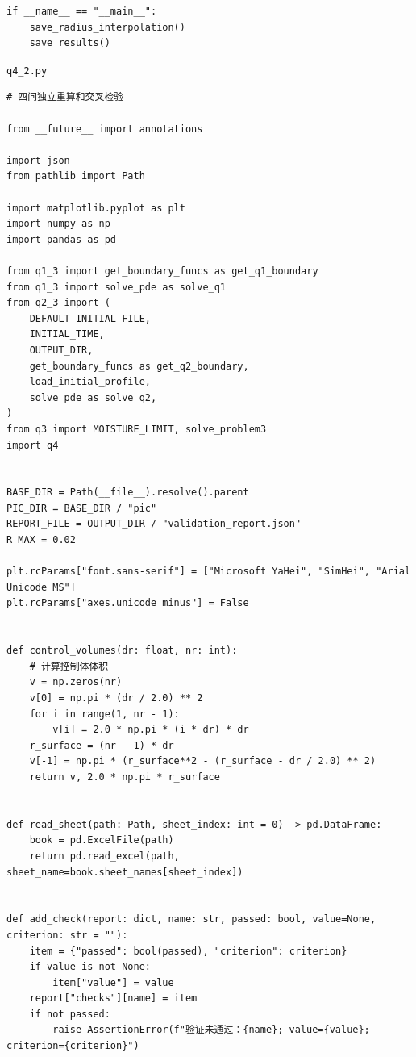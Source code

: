 \documentclass[withoutpreface,bwprint]{cumcm_thesis}
\begin{document}
\begin{appendices}
\begin{lstlisting}
if __name__ == "__main__":
    save_radius_interpolation()
    save_results()

\end{lstlisting}
\noindent\texttt{q4\_2.py}
\begin{lstlisting}
# 四问独立重算和交叉检验

from __future__ import annotations

import json
from pathlib import Path

import matplotlib.pyplot as plt
import numpy as np
import pandas as pd

from q1_3 import get_boundary_funcs as get_q1_boundary
from q1_3 import solve_pde as solve_q1
from q2_3 import (
    DEFAULT_INITIAL_FILE,
    INITIAL_TIME,
    OUTPUT_DIR,
    get_boundary_funcs as get_q2_boundary,
    load_initial_profile,
    solve_pde as solve_q2,
)
from q3 import MOISTURE_LIMIT, solve_problem3
import q4


BASE_DIR = Path(__file__).resolve().parent
PIC_DIR = BASE_DIR / "pic"
REPORT_FILE = OUTPUT_DIR / "validation_report.json"
R_MAX = 0.02

plt.rcParams["font.sans-serif"] = ["Microsoft YaHei", "SimHei", "Arial Unicode MS"]
plt.rcParams["axes.unicode_minus"] = False


def control_volumes(dr: float, nr: int):
    # 计算控制体体积
    v = np.zeros(nr)
    v[0] = np.pi * (dr / 2.0) ** 2
    for i in range(1, nr - 1):
        v[i] = 2.0 * np.pi * (i * dr) * dr
    r_surface = (nr - 1) * dr
    v[-1] = np.pi * (r_surface**2 - (r_surface - dr / 2.0) ** 2)
    return v, 2.0 * np.pi * r_surface


def read_sheet(path: Path, sheet_index: int = 0) -> pd.DataFrame:
    book = pd.ExcelFile(path)
    return pd.read_excel(path, sheet_name=book.sheet_names[sheet_index])


def add_check(report: dict, name: str, passed: bool, value=None, criterion: str = ""):
    item = {"passed": bool(passed), "criterion": criterion}
    if value is not None:
        item["value"] = value
    report["checks"][name] = item
    if not passed:
        raise AssertionError(f"验证未通过：{name}; value={value}; criterion={criterion}")



\end{lstlisting}
\end{appendices}
\end{document}
